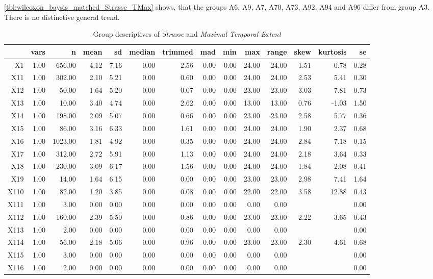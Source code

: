 \cref{tbl:wilcoxon_baysis_matched_Strasse_TMax} shows, that the groups A6, A9, A7, A70, A73, A92, A94 and A96 differ from group A3. There is no distinctive general trend.
\begin{table}[ht!]
	\tiny
	\centering
  \begin{tabular}{rrrrrrrrrrrrrr}
    \hline
   & vars & n & mean & sd & median & trimmed & mad & min & max & range & skew & kurtosis & se \\ 
    \hline
  X1 & 1.00 & 656.00 & 4.12 & 7.16 & 0.00 & 2.56 & 0.00 & 0.00 & 24.00 & 24.00 & 1.51 & 0.78 & 0.28 \\ 
    X11 & 1.00 & 302.00 & 2.10 & 5.21 & 0.00 & 0.60 & 0.00 & 0.00 & 24.00 & 24.00 & 2.53 & 5.41 & 0.30 \\ 
    X12 & 1.00 & 50.00 & 1.64 & 5.20 & 0.00 & 0.07 & 0.00 & 0.00 & 23.00 & 23.00 & 3.03 & 7.81 & 0.73 \\ 
    X13 & 1.00 & 10.00 & 3.40 & 4.74 & 0.00 & 2.62 & 0.00 & 0.00 & 13.00 & 13.00 & 0.76 & -1.03 & 1.50 \\ 
    X14 & 1.00 & 198.00 & 2.09 & 5.07 & 0.00 & 0.66 & 0.00 & 0.00 & 23.00 & 23.00 & 2.58 & 5.77 & 0.36 \\ 
    X15 & 1.00 & 86.00 & 3.16 & 6.33 & 0.00 & 1.61 & 0.00 & 0.00 & 24.00 & 24.00 & 1.90 & 2.37 & 0.68 \\ 
    X16 & 1.00 & 1023.00 & 1.81 & 4.92 & 0.00 & 0.35 & 0.00 & 0.00 & 24.00 & 24.00 & 2.84 & 7.18 & 0.15 \\ 
    X17 & 1.00 & 312.00 & 2.72 & 5.91 & 0.00 & 1.13 & 0.00 & 0.00 & 24.00 & 24.00 & 2.18 & 3.64 & 0.33 \\ 
    X18 & 1.00 & 230.00 & 3.09 & 6.17 & 0.00 & 1.56 & 0.00 & 0.00 & 24.00 & 24.00 & 1.84 & 2.08 & 0.41 \\ 
    X19 & 1.00 & 14.00 & 1.64 & 6.15 & 0.00 & 0.00 & 0.00 & 0.00 & 23.00 & 23.00 & 2.98 & 7.41 & 1.64 \\ 
    X110 & 1.00 & 82.00 & 1.20 & 3.85 & 0.00 & 0.08 & 0.00 & 0.00 & 22.00 & 22.00 & 3.58 & 12.88 & 0.43 \\ 
    X111 & 1.00 & 3.00 & 0.00 & 0.00 & 0.00 & 0.00 & 0.00 & 0.00 & 0.00 & 0.00 &  &  & 0.00 \\ 
    X112 & 1.00 & 160.00 & 2.39 & 5.50 & 0.00 & 0.86 & 0.00 & 0.00 & 23.00 & 23.00 & 2.22 & 3.65 & 0.43 \\ 
    X113 & 1.00 & 2.00 & 0.00 & 0.00 & 0.00 & 0.00 & 0.00 & 0.00 & 0.00 & 0.00 &  &  & 0.00 \\ 
    X114 & 1.00 & 56.00 & 2.18 & 5.06 & 0.00 & 0.96 & 0.00 & 0.00 & 23.00 & 23.00 & 2.30 & 4.61 & 0.68 \\ 
    X115 & 1.00 & 3.00 & 0.00 & 0.00 & 0.00 & 0.00 & 0.00 & 0.00 & 0.00 & 0.00 &  &  & 0.00 \\ 
    X116 & 1.00 & 2.00 & 0.00 & 0.00 & 0.00 & 0.00 & 0.00 & 0.00 & 0.00 & 0.00 &  &  & 0.00 \\ 
     \hline
  \end{tabular}
	\caption{Group descriptives of \textit{Strasse} and \textit{Maximal Temporal Extent}}
	\label{tbl:descriptives_baysis_matched_Strasse_TMax}
\end{table}

